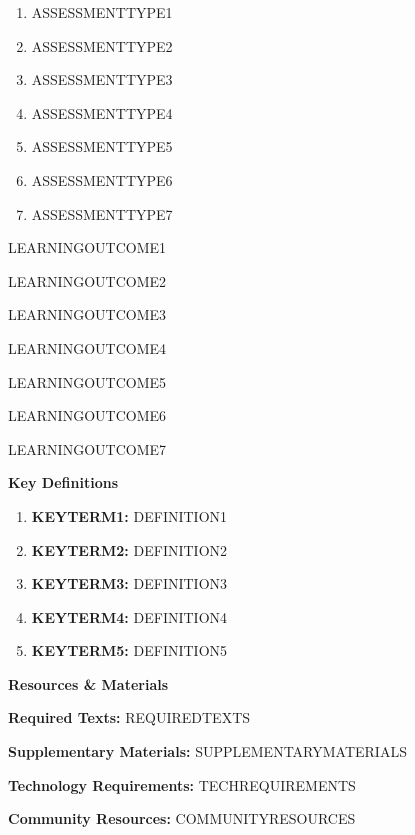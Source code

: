 \documentclass{article}
\begin{document}
\begin{enumerate}
	
\item ASSESSMENTTYPE1
 
\item ASSESSMENTTYPE2
 
\item ASSESSMENTTYPE3
 
\item ASSESSMENTTYPE4
 
 \item ASSESSMENTTYPE5
 
 \item ASSESSMENTTYPE6
 
 \item ASSESSMENTTYPE7
 
\end{enumerate}

LEARNINGOUTCOME1

LEARNINGOUTCOME2

LEARNINGOUTCOME3

LEARNINGOUTCOME4

LEARNINGOUTCOME5

LEARNINGOUTCOME6

LEARNINGOUTCOME7

\pagebreak
 
{\huge \textbf{Key Definitions}}
\begin{enumerate}
	\item \textbf{KEYTERM1:} DEFINITION1
	\item \textbf{KEYTERM2:} DEFINITION2
	\item \textbf{KEYTERM3:} DEFINITION3
	\item \textbf{KEYTERM4:} DEFINITION4
	\item \textbf{KEYTERM5:} DEFINITION5
\end{enumerate}

\pagebreak



{\huge \textbf{Resources \& Materials}}

\textbf{Required Texts:} REQUIREDTEXTS

\textbf{Supplementary Materials:} SUPPLEMENTARYMATERIALS

\textbf{Technology Requirements:} TECHREQUIREMENTS

\textbf{Community Resources:} COMMUNITYRESOURCES

\vspace{1cm}

\pagebreak
\end{document}
